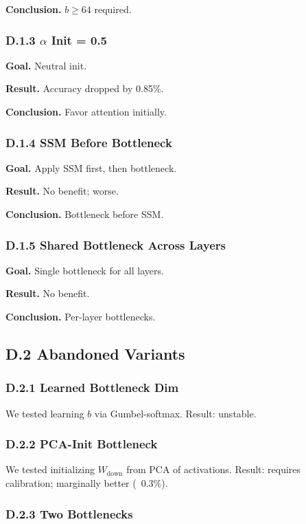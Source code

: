 \textbf{Conclusion.} $b \geq 64$ required.

\subsubsection{D.1.3 $\alpha$ Init = 0.5}

\textbf{Goal.} Neutral init.

\textbf{Result.} Accuracy dropped by 0.85\%.

\textbf{Conclusion.} Favor attention initially.

\subsubsection{D.1.4 SSM Before Bottleneck}

\textbf{Goal.} Apply SSM first, then bottleneck.

\textbf{Result.} No benefit; worse.

\textbf{Conclusion.} Bottleneck before SSM.

\subsubsection{D.1.5 Shared Bottleneck Across Layers}

\textbf{Goal.} Single bottleneck for all layers.

\textbf{Result.} No benefit.

\textbf{Conclusion.} Per-layer bottlenecks.

\subsection{D.2 Abandoned Variants}

\subsubsection{D.2.1 Learned Bottleneck Dim}

We tested learning $b$ via Gumbel-softmax. Result: unstable.

\subsubsection{D.2.2 PCA-Init Bottleneck}

We tested initializing $W_\text{down}$ from PCA of activations. Result: 
requires calibration; marginally better (~0.3\%).

\subsubsection{D.2.3 Two Bottlenecks}

